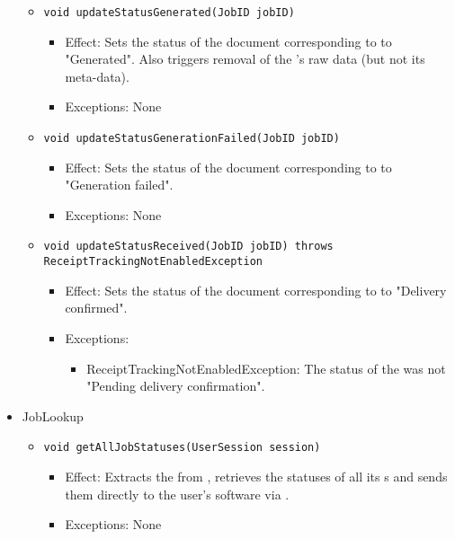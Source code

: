 \begin{itemize}
\begin{itemize}
		\item \texttt{void updateStatusGenerated(JobID jobID)}
		\begin{itemize}
            \item Effect: Sets the status of the document corresponding to  to "Generated". Also triggers removal of the 's raw data (but not its meta-data).
            \item Exceptions: None
        \end{itemize}

		\item \texttt{void updateStatusGenerationFailed(JobID jobID)}
		\begin{itemize}
            \item Effect: Sets the status of the document corresponding to  to "Generation failed".
            \item Exceptions: None
        \end{itemize}

		\item \texttt{void updateStatusReceived(JobID jobID) throws ReceiptTrackingNotEnabledException}
		\begin{itemize}
            \item Effect: Sets the status of the document corresponding to  to "Delivery confirmed".
            \item Exceptions:
			\begin{itemize}
				\item ReceiptTrackingNotEnabledException: The status of the  was not "Pending delivery confirmation".
			\end{itemize}
        \end{itemize}
    \end{itemize}

    \item JobLookup
    \begin{itemize}
        \item \texttt{void getAllJobStatuses(UserSession session)}
        \begin{itemize}
            \item Effect: Extracts the  from , retrieves the statuses of all its s and sends them directly to the user's software via .
            \item Exceptions: None
        \end{itemize}
    \end{itemize}


\end{itemize}

